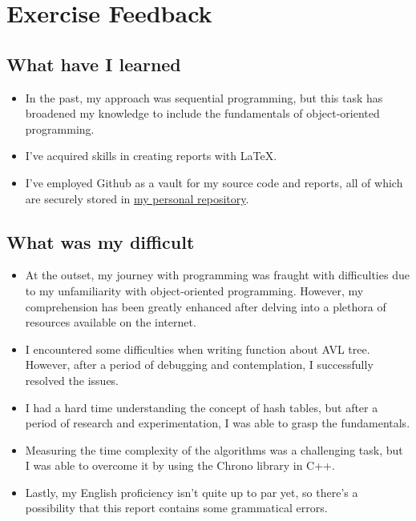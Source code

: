 \section{Exercise Feedback}

\subsection{What have I learned}
\begin{itemize}
    \item In the past, my approach was sequential programming, but this task has broadened my knowledge to include the fundamentals of object-oriented programming.
    \item I’ve acquired skills in creating reports with \LaTeX.
    \item I’ve employed Github as a vault for my source code and reports, all of which are securely stored in \href{https://github.com/KhoaNguyen-HCMUS/HCMUS-course}{my personal repository}.
\end{itemize}
\subsection{What was my difficult}
\begin{itemize}
    \item At the outset, my journey with programming was fraught with difficulties due to my unfamiliarity with object-oriented programming. However, my comprehension has been greatly enhanced after delving into a plethora of resources available on the internet. \cite{OOP_in_C++}
    \item I encountered some difficulties when writing function about AVL tree. However, after a period of debugging and contemplation, I successfully resolved the issues. \cite{AVL_Tree}
    \item I had a hard time understanding the concept of hash tables, but after a period of research and experimentation, I was able to grasp the fundamentals.
    \item Measuring the time complexity of the algorithms was a challenging task, but I was able to overcome it by using the Chrono library in C++. \cite{Measure_time_in_C++}
    \item Lastly, my English proficiency isn’t quite up to par yet, so there’s a possibility that this report contains some grammatical errors.
\end{itemize}


